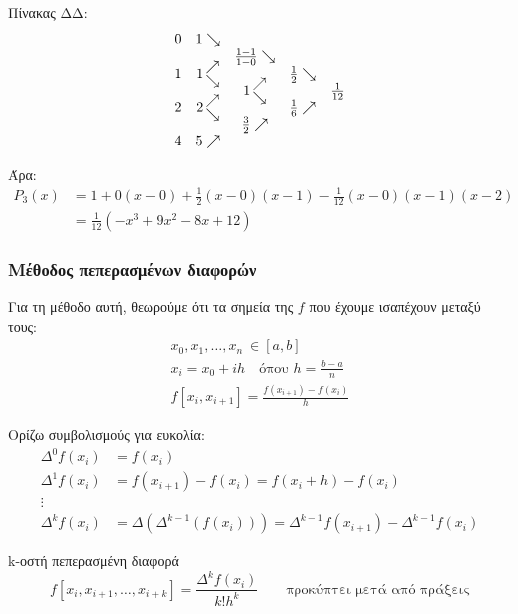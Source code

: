 \documentclass[11pt,a4paper,notitlepage,fleqn]{article}
\begin{document}
 	Πίνακας ΔΔ:
 	\[
 	\begin{array}{ccccc}
 	0 & 1 \searrow & & &  \\
 	& & \frac{1-1}{1-0} \searrow & & \\
 	1 & 1 \nesearrow & & \frac{1}{2} \searrow & \\
 	& & 1 \nesearrow & & \frac{1}{12} \\
 	2 & 2 \nesearrow & & \frac{1}{6} \nearrow & \\
 	& & \frac{3}{2} \nearrow & & \\
 	4 & 5 \nearrow & & &
 	\end{array}
 	\]
 	
 	Άρα:
 	\begin{align*}
 	P_3(x) &= 1 + 0(x-0) + \frac{1}{2}(x-0)(x-1)-\frac{1}{12}
 	(x-0)(x-1)(x-2) \\ &= \frac{1}{12} (-x^3+9x^2-8x+12)
 	\end{align*}
 	
 	\subsubsection{Μέθοδος πεπερασμένων διαφορών}
 	Για τη μέθοδο αυτή, θεωρούμε ότι τα σημεία της \( f \)
 	που έχουμε ισαπέχουν μεταξύ τους:
 	\begin{gather*}
 		x_0,x_1,\dots,x_n \ \in [a,b] \\
 		x_i = x_0 + ih \quad \text{όπου } h=\frac{b-a}{n}
 		\\[.4ex]
 		f\left[x_i,x_{i+1}\right] =
 		\frac{f(x_{i+1})-f(x_i)}{h}
 	\end{gather*}
 	
 	Ορίζω συμβολισμούς για ευκολία:
 	\begin{align*}
 		\Delta^0 f(x_i) &= f(x_i) \\
 		\Delta^1 f(x_i) &=
 		f(x_{i+1}) - f(x_i) = f(x_i+h) - f(x_i) \\
 		\vdots \\
 		\Delta^k f(x_i) &=
 		\Delta \left(\Delta^{k-1}\left(f(x_i)\right)\right)
 		= \Delta^{k-1} f(x_{i+1}) - \Delta^{k-1} f(x_i)
 	\end{align*}
 	
 	\begin{defn}{k-οστή πεπερασμένη διαφορά}{}
 		\[
 			f\left[x_i,x_{i+1},\dots,x_{i+k}\right]
 			= \frac{\Delta^k f(x_i)}{k! h^k}
 			\qquad \text{προκύπτει μετά από πράξεις}
 		\]
 	\end{defn}
 	
\end{document}
